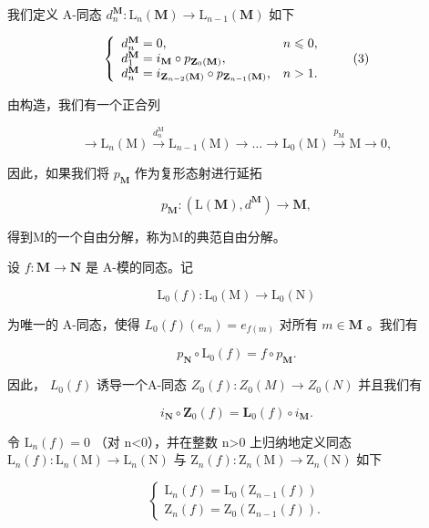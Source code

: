 我们定义 A-同态 \(d_{n}^{\mathbf{M}}:\mathrm{L}_{n}(\mathbf{M})\to \mathrm{L}_{n - 1}(\mathbf{M})\) 如下

\[
\left\{ \begin{array}{l l} d _ {n} ^ {\mathbf {M}} = 0, & n \leqslant 0, \\ d _ {1} ^ {\mathbf {M}} = i _ {\mathbf {M}} \circ p _ {\mathbf {Z} _ {0} (\mathbf {M})}, & \\ d _ {n} ^ {\mathbf {M}} = i _ {\mathbf {Z} _ {n - 2} (\mathbf {M})} \circ p _ {\mathbf {Z} _ {n - 1} (\mathbf {M})}, & n > 1. \end{array} \right.\tag{3}
\]

由构造，我们有一个正合列

\[
\longrightarrow \mathrm{L} _ {n} (\mathrm{M}) \xrightarrow {d _ {n} ^ {\mathrm{M}}} \mathrm{L} _ {n - 1} (\mathrm{M}) \longrightarrow \dots \longrightarrow \mathrm{L} _ {0} (\mathrm{M}) \xrightarrow {p _ {\mathrm{M}}} \mathrm{M} \longrightarrow 0,
\]

因此，如果我们将 \(p_{\mathbf{M}}\) 作为复形态射进行延拓

\[
p _ {\mathbf {M}}: (\mathrm{L} (\mathbf {M}), d ^ {\mathbf {M}}) \rightarrow \mathbf {M},
\]

得到M的一个自由分解，称为M的典范自由分解。

设 \(f: \mathbf{M} \to \mathbf{N}\) 是 A-模的同态。记

\[
\mathrm{L} _ {0} (f): \mathrm{L} _ {0} (\mathrm{M}) \rightarrow \mathrm{L} _ {0} (\mathrm{N})
\]

为唯一的 A-同态，使得 \(L_0(f)(e_m) = e_{f(m)}\) 对所有 \(m \in \mathbf{M}\) 。我们有

\[
p _ {\mathbf {N}} \circ \mathrm{L} _ {0} (f) = f \circ p _ {\mathbf {M}}.\tag{4}
\]

因此， \(L_0(f)\) 诱导一个A-同态 \(Z_0(f):Z_0(M)\to Z_0(N)\) 并且我们有

\[
i _ {\mathbf {N}} \circ \mathbf {Z} _ {0} (f) = \mathbf {L} _ {0} (f) \circ i _ {\mathbf {M}}.\tag{5}
\]

令 \(\mathrm{L}_{n}(f)=0\) （对 n\textless0），并在整数 n\textgreater0 上归纳地定义同态 \(\mathrm{L}_{n}(f):\mathrm{L}_{n}(\mathrm{M})\to\mathrm{L}_{n}(\mathrm{N})\) 与 \(\mathrm{Z}_{n}(f):\mathrm{Z}_{n}(\mathrm{M})\to\mathrm{Z}_{n}(\mathrm{N})\) 如下

\[
\left\{ \begin{array}{l} \mathrm{L} _ {n} (f) = \mathrm{L} _ {0} (\mathrm{Z} _ {n - 1} (f)) \\ \mathrm{Z} _ {n} (f) = \mathrm{Z} _ {0} (\mathrm{Z} _ {n - 1} (f)). \end{array} \right.\tag{6}
\]

